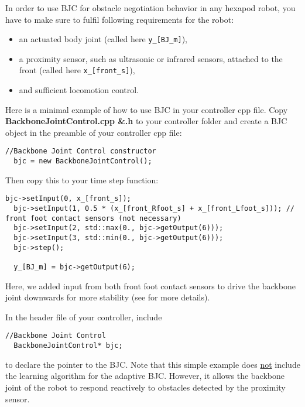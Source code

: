 \documentclass[a3, 14pt]{sciposter}
\begin{document}
\begin{multicols}{2}
In order to use BJC for obstacle negotiation behavior in any hexapod robot, you have to make sure to fulfil following requirements for the robot:

\begin{itemize}
 \item an actuated body joint (called here \texttt{y\_[BJ\_m]}),
 \item a proximity sensor, such as ultrasonic or infrared sensors, attached to the front (called here \texttt{x\_[front\_s]}),
 \item and sufficient locomotion control.
\end{itemize}

Here is a minimal example of how to use BJC in your controller cpp file. Copy \textbf{BackboneJointControl.cpp \&.h} to your controller folder and create a BJC object in the preamble of your controller cpp file:

\begin{lstlisting}[numbers=none]
//Backbone Joint Control constructor
  bjc = new BackboneJointControl();
\end{lstlisting}

\vspace{0.5cm}

Then copy this to your time step function:
  
\begin{lstlisting}[numbers=none]
  bjc->setInput(0, x_[front_s]);
  bjc->setInput(1, 0.5 * (x_[front_Rfoot_s] + x_[front_Lfoot_s])); // front foot contact sensors (not necessary)
  bjc->setInput(2, std::max(0., bjc->getOutput(6)));
  bjc->setInput(3, std::min(0., bjc->getOutput(6)));
  bjc->step();

  y_[BJ_m] = bjc->getOutput(6);
\end{lstlisting}
Here, we added input from both front foot contact sensors to drive the backbone joint downwards for more stability (see \cite{Goldschmidt2014} for more details).

\vspace{0.5cm}

In the header file of your controller, include

\begin{lstlisting}[numbers=none]
//Backbone Joint Control
  BackboneJointControl* bjc;
\end{lstlisting}

to declare the pointer to the BJC. Note that this simple example does \underline{not} include the learning algorithm for the adaptive BJC. However, it allows the backbone joint of the robot to respond reactively to obstacles detected by the proximity sensor. 







\end{multicols}
\end{document}
